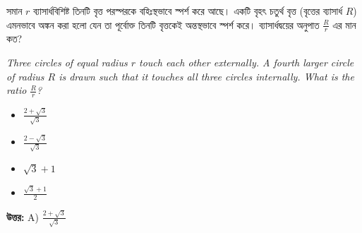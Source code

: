\documentclass[12pt, a4paper]{article}
\begin{document}
\begin{tcolorbox}[questionbox={প্রশ্ন (Question) 25}]
    \noindent
    সমান $r$ ব্যাসার্ধবিশিষ্ট তিনটি বৃত্ত পরস্পরকে বহিঃস্থভাবে স্পর্শ করে আছে। একটি বৃহৎ চতুর্থ বৃত্ত (বৃত্তের ব্যাসার্ধ $R$) এমনভাবে অঙ্কন করা হলো যেন তা পূর্বোক্ত তিনটি বৃত্তকেই অন্তস্থভাবে স্পর্শ করে। ব্যাসার্ধদ্বয়ের অনুপাত $\frac{R}{r}$ এর মান কত?
    
    \vspace{0.8em}
    \begin{english}
    \noindent\textit{\color{darkgray}
    Three circles of equal radius $r$ touch each other externally. A fourth larger circle of radius $R$ is drawn such that it touches all three circles internally. What is the ratio $\frac{R}{r}$?
    }
    \end{english}
\end{tcolorbox}

\begin{itemize}[label={}, leftmargin=1cm, itemsep=0.5em]
    \item[\textbf{A)}] $\frac{2+\sqrt{3}}{\sqrt{3}}$
    \item[\textbf{B)}] $\frac{2-\sqrt{3}}{\sqrt{3}}$
    \item[\textbf{C)}] $\sqrt{3} + 1$
    \item[\textbf{D)}] $\frac{\sqrt{3}+1}{2}$
\end{itemize}

\vspace{0.5em}
\begin{tcolorbox}[answerbox]
    \textbf{\color{success} উত্তর:} A) $\frac{2+\sqrt{3}}{\sqrt{3}}$
\end{tcolorbox}
\vspace{1em}
\end{document}
